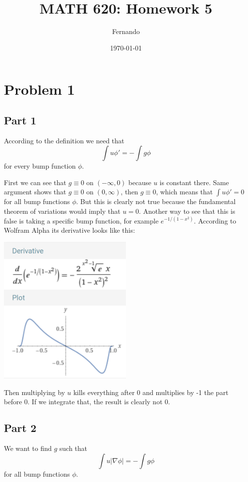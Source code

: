 \documentclass{article}
\title{MATH 620: Homework 5}
\author{Fernando}
\date{\today}
\begin{document}
\maketitle
\section*{Problem 1}
\subsection*{Part 1}
According to the definition we need that
\[
	\int u \phi' = -\int g \phi
\]
for every bump function $\phi$.

First we can see that $g\equiv 0$ on $(-\infty,0)$ because $u$ is constant
there. Same argument shows that $g\equiv 0$ on $(0,\infty)$, then
$g\equiv 0$, which means that $\int u \phi' = 0$ for all bump
functions $\phi$. But this is clearly not true because the fundamental theorem
of variations would imply that $u=0$. Another way to see that this is false is
taking a specific bump function, for example $e^{-1/(1-x^2)}$. According to
Wolfram Alpha its derivative looks like this:

\begin{center}
\includegraphics[width=0.5\textwidth]{bumpPrime.png}
\end{center}

Then multiplying by $u$ kills everything after 0 and multiplies by -1 the part
before 0. If we integrate that, the result is clearly not 0.
\subsection*{Part 2}
We want to find $g$ such that
\[
	\int u |\nabla \phi| = -\int g \phi
\]
for all bump functions $\phi$.
\end{document}
